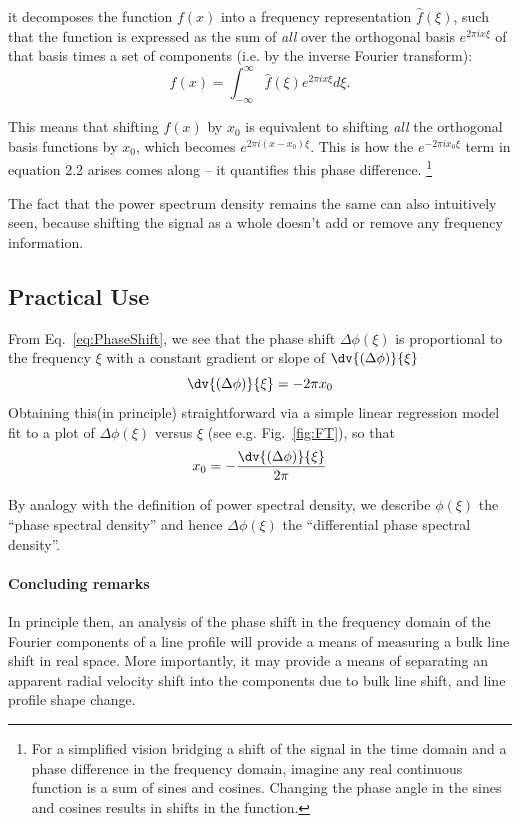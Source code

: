 it decomposes the function $f(x)$ into a frequency representation $\hat{f}(\xi)$, such that the function is expressed  
as the sum of \textit{all} over the orthogonal basis $e^{2 \pi ix \xi}$ of that basis times a set of components (i.e.
by the inverse Fourier transform):
\begin{equation}
	f(x) = \int_{-\infty}^{\infty} \hat{f}(\xi) e^{2 \pi ix \xi} d\xi. 
\end{equation}

This means that shifting $f(x)$ by $x_0$ is equivalent to shifting \textit{all} the orthogonal basis functions by $x_0$, which becomes 
$e^{2 \pi i(x-x_0) \xi}$. This is how the $e^{-2 \pi ix_0 \xi}$ term in equation 2.2 arises comes along -- it quantifies this phase difference. 
\footnote{For a simplified vision bridging a shift of the signal in the time domain and a phase difference in the frequency domain, imagine any real continuous function is a sum of sines and cosines. Changing the phase angle in the sines and cosines results in shifts in the function.}

The fact that the power spectrum density remains the same can also intuitively seen, because shifting the signal as a whole 
doesn't add or remove any frequency information. 


\subsection{Practical Use}

From Eq.~\ref{eq:PhaseShift}, we see that the phase shift $\Delta \phi(\xi)$ is proportional to the frequency $\xi$
with a constant gradient or slope of $\dv{(\Delta \phi)}{\xi}$
\begin{equation}
	\dv{(\Delta \phi)}{\xi} = -2 \pi x_0
\label{eq:gradient}
\end{equation}
Obtaining this(in principle) straightforward via a simple linear regression model fit to a plot of $\Delta \phi(\xi)$ versus $\xi$ 
 (see e.g. Fig.~\ref{fig:FT}), so that
\begin{equation}
	x_0 = -\frac{\dv{(\Delta \phi)}{\xi}}{2 \pi}
\label{eq:line_shift}
\end{equation}

By analogy with the definition of power spectral density, we describe $\phi(\xi)$ the ``phase spectral density'' and hence $\Delta \phi(\xi)$ the ``differential phase spectral density''. 

\paragraph{Concluding remarks}
In principle then, an  analysis of the phase shift in the frequency domain of the Fourier components of
a line profile will provide a means of measuring a bulk line shift in real space. More importantly,
it may provide a means of separating  an apparent radial velocity shift into the components due to bulk line shift, 
and line profile shape change.



